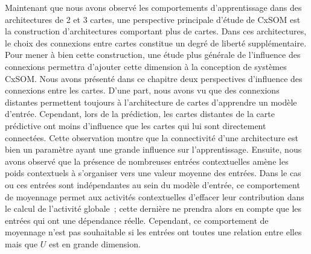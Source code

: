 \documentclass[../main]{subfiles}
\begin{document}
Maintenant que nous avons observé les comportements d'apprentissage dans des architectures de 2 et 3 cartes, une perspective principale d'étude de CxSOM est la construction d'architectures comportant plus de cartes.
Dans ces architectures, le choix des connexions entre cartes constitue un degré de liberté supplémentaire.
Pour mener à bien cette construction, une étude plus générale de l'influence des connexions permettra d'ajouter cette dimension à la conception de systèmes CxSOM.
Nous avons présenté dans ce chapitre deux perspectives d'influence des connexions entre les cartes.
D'une part, nous avons vu que des connexions distantes permettent toujours à l'architecture de cartes d'apprendre un modèle d'entrée. Cependant, lors de la prédiction, les cartes distantes de la carte prédictive ont moins d'influence que les cartes qui lui sont directement connectées. Cette observation montre que la connectivité d'une architecture est bien un paramètre ayant une grande influence sur l'apprentissage. 
Ensuite, nous avons observé que la présence de nombreuses entrées contextuelles amène les poids contextuels à s'organiser vers une valeur moyenne des entrées. Dans le cas ou ces entrées sont indépendantes au sein du modèle d'entrée, ce comportement de moyennage permet aux activités contextuelles d'effacer leur contribution dans le calcul de l'activité globale~; cette dernière ne prendra alors en compte que les entrées qui ont une dépendance réelle.
Cependant, ce comportement de moyennage n'est pas souhaitable si les entrées ont toutes une relation entre elles mais que $U$ est en grande dimension.
\end{document}
